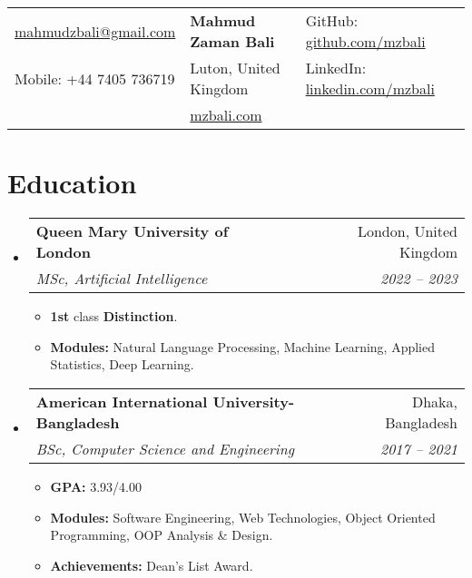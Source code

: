 \documentclass[letterpaper,11pt]{article}
\makeatletter
\newcommand{\resumeItem}[1]{
  \item\small{
    {#1 \vspace{-2pt}}
  }
}
\newcommand{\resumeSubheading}[4]{
  \vspace{-2pt}\item
    \begin{tabular*}{0.97\textwidth}[t]{l@{\extracolsep{\fill}}r}
      \textbf{#1} & #2 \\
      \textit{\small#3} & \textit{\small #4} \\
    \end{tabular*}\vspace{-7pt}
}
\newcommand{\resumeSubHeadingListStart}{\begin{itemize}[leftmargin=0.15in, label={}]}
\newcommand{\resumeSubHeadingListEnd}{\end{itemize}}
\newcommand{\resumeItemListStart}{\begin{itemize}}
\newcommand{\resumeItemListEnd}{\end{itemize}\vspace{-5pt}}
\makeatother
\begin{document}

\begin{tabularx}{\textwidth}{>{\raggedright\arraybackslash}X >{\centering\arraybackslash}X >{\raggedleft\arraybackslash}X}
    \href{mailto:mahmudzbali@gmail.com}{mahmudzbali@gmail.com} & \textbf{{\Large Mahmud Zaman Bali}} & GitHub: \href{https://github.com/mzbali}{github.com/mzbali} \\
    Mobile: +44 7405 736719 & Luton, United Kingdom & LinkedIn: \href{https://www.linkedin.com/in/mzbali/}{ linkedin.com/mzbali} \\
    & \href{https://mzbali.com/}{mzbali.com} & \\
\end{tabularx}




\section{Education}
  \resumeSubHeadingListStart
    \resumeSubheading
      {Queen Mary University of London}{London, United Kingdom}
      {MSc, Artificial Intelligence}{2022 -- 2023}
      \resumeItemListStart
        \resumeItem{\textbf{1st} class \textbf{Distinction}.}
        \resumeItem{\textbf{Modules:} Natural Language Processing, Machine Learning, Applied Statistics, Deep Learning.}
      \resumeItemListEnd
    \resumeSubheading
      {American International University-Bangladesh}{Dhaka, Bangladesh}
      {BSc, Computer Science and Engineering}{2017 -- 2021}
    \resumeItemListStart
        \resumeItem{\textbf{GPA:} 3.93/4.00}
        \resumeItem{\textbf{Modules:} Software Engineering, Web Technologies, Object Oriented Programming, OOP Analysis \& Design.}
        \resumeItem{\textbf{Achievements:} Dean’s List Award.}
    \resumeItemListEnd
  \resumeSubHeadingListEnd


\end{document}
